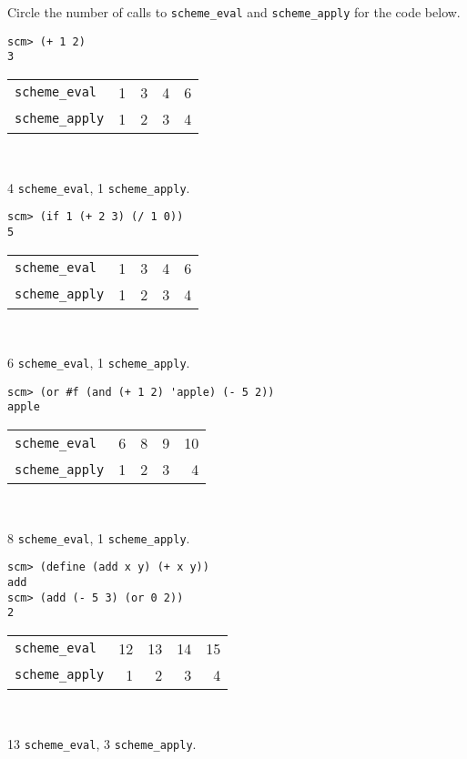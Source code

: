 \begin{blocksection}
\question Circle the number of calls to \lstinline$scheme_eval$ and
\lstinline$scheme_apply$ for the code below.

 \begin{lstlisting}
scm> (+ 1 2)
3
\end{lstlisting}

\begin{tabular}{lrrrr}
\lstinline$scheme_eval$ & 1 & 3 & 4 & 6 \\
\lstinline$scheme_apply$ & 1 & 2 & 3 & 4
\end{tabular}
\\

\begin{solution}
4 \lstinline$scheme_eval$, 1 \lstinline$scheme_apply$.
\end{solution}

\vspace{2\baselineskip}
\begin{lstlisting}
scm> (if 1 (+ 2 3) (/ 1 0))
5
\end{lstlisting}

\begin{tabular}{lrrrr}
\lstinline$scheme_eval$ & 1 & 3 & 4 & 6 \\
\lstinline$scheme_apply$ & 1 & 2 & 3 & 4
\end{tabular}
\\

\begin{solution}
6 \lstinline$scheme_eval$, 1 \lstinline$scheme_apply$.
\end{solution}

\vspace{2\baselineskip}
\begin{lstlisting}
scm> (or #f (and (+ 1 2) 'apple) (- 5 2))
apple
\end{lstlisting}

\begin{tabular}{lrrrr}
\lstinline$scheme_eval$ & 6 & 8 & 9 & 10 \\
\lstinline$scheme_apply$ & 1 & 2 & 3 & 4
\end{tabular}
\\

\begin{solution}
8 \lstinline$scheme_eval$, 1 \lstinline$scheme_apply$.
\end{solution}

\vspace{2\baselineskip}
\begin{lstlisting}
scm> (define (add x y) (+ x y))
add
scm> (add (- 5 3) (or 0 2))
2
\end{lstlisting}

\begin{tabular}{lrrrr}
\lstinline$scheme_eval$ & 12 & 13 & 14 & 15 \\
\lstinline$scheme_apply$ & 1 & 2 & 3 & 4
\end{tabular}
\\

\begin{solution}
13 \lstinline$scheme_eval$, 3 \lstinline$scheme_apply$.
\end{solution}
\end{blocksection}
